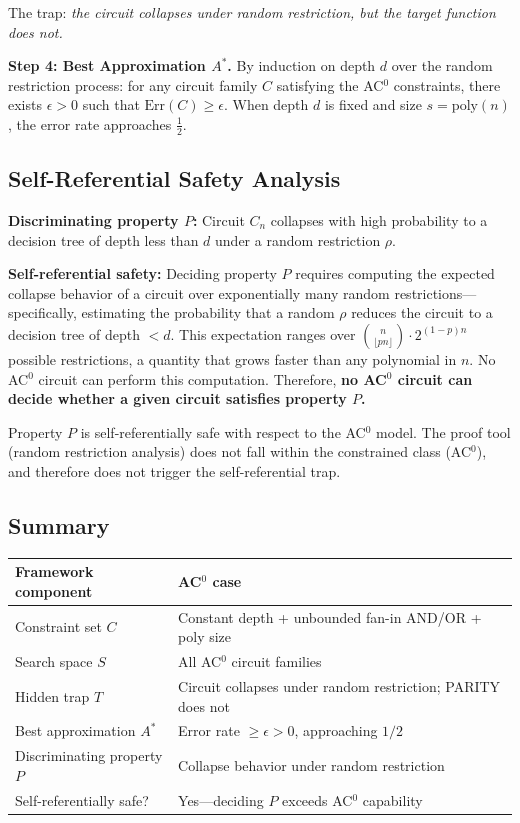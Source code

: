 \documentclass[11pt,a4paper]{article}
\theoremstyle{plain}
\theoremstyle{definition}
\theoremstyle{remark}
\newcommand{\Err}{\mathrm{Err}}
\begin{document}
The trap: \emph{the circuit collapses under random restriction, but the target function does not.}

\textbf{Step 4: Best Approximation $A^*$.} By induction on depth $d$ over the random restriction process: for any circuit family $C$ satisfying the AC$^0$ constraints, there exists $\epsilon > 0$ such that $\Err(C) \geq \epsilon$. When depth $d$ is fixed and size $s = \mathrm{poly}(n)$, the error rate approaches $\frac{1}{2}$.

\subsection{Self-Referential Safety Analysis}

\textbf{Discriminating property $P$:} Circuit $C_n$ collapses with high probability to a decision tree of depth less than $d$ under a random restriction $\rho$.

\textbf{Self-referential safety:} Deciding property $P$ requires computing the expected collapse behavior of a circuit over exponentially many random restrictions---specifically, estimating the probability that a random $\rho$ reduces the circuit to a decision tree of depth $< d$. This expectation ranges over $\binom{n}{\lfloor pn \rfloor} \cdot 2^{(1-p)n}$ possible restrictions, a quantity that grows faster than any polynomial in $n$. No AC$^0$ circuit can perform this computation. Therefore, \textbf{no AC$^0$ circuit can decide whether a given circuit satisfies property $P$.}

Property $P$ is self-referentially safe with respect to the AC$^0$ model. The proof tool (random restriction analysis) does not fall within the constrained class (AC$^0$), and therefore does not trigger the self-referential trap.

\subsection{Summary}

\begin{table}[h]
\centering
\begin{tabular}{@{}ll@{}}
\toprule
Framework component & AC$^0$ case \\
\midrule
Constraint set $C$ & Constant depth + unbounded fan-in AND/OR + poly size \\
Search space $S$ & All AC$^0$ circuit families \\
Hidden trap $T$ & Circuit collapses under random restriction; PARITY does not \\
Best approximation $A^*$ & Error rate $\geq \epsilon > 0$, approaching $1/2$ \\
Discriminating property $P$ & Collapse behavior under random restriction \\
Self-referentially safe? & Yes---deciding $P$ exceeds AC$^0$ capability \\
\bottomrule
\end{tabular}
\end{table}
\end{document}
